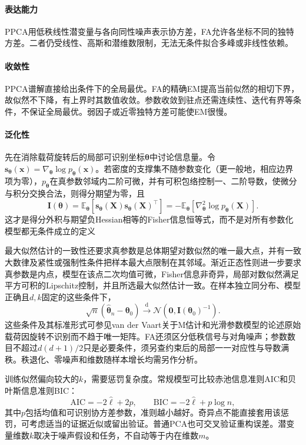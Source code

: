 \paragraph{表达能力}
PPCA用低秩线性潜变量与各向同性噪声表示协方差，FA允许各坐标不同的独特方差。二者仍受线性、高斯和潜维数限制，无法无条件拟合多峰或非线性依赖。

\paragraph{收敛性}

PPCA谱解直接给出条件下的全局最优。FA的精确EM提高当前似然的相切下界，故似然不下降，有上界时其数值收敛。参数收敛到驻点还需连续性、迭代有界等条件，不保证全局最优。弱因子或近零独特方差可能使EM很慢。

\paragraph{泛化性}

先在消除载荷旋转后的局部可识别坐标$\bm{\theta}$中讨论信息量。令$\bm{s}_{\bm{\theta}}(\bm{x})=\nabla_{\bm{\theta}}\log p_{\bm{\theta}}(\bm{x})$。若密度的支撑集不随参数变化（更一般地，相应边界项为零），$p_{\bm{\theta}}$在真参数邻域内二阶可微，并有可积包络控制一、二阶导数，使微分与积分交换合法，则得分期望为零，且
\[
  \bm{I}(\bm{\theta})
  =\mathbb{E}_{\bm{\theta}}\!\left[
      \bm{s}_{\bm{\theta}}(\bm{X})
      \bm{s}_{\bm{\theta}}(\bm{X})^{\top}
    \right]
  =-\mathbb{E}_{\bm{\theta}}\!\left[
      \nabla_{\bm{\theta}}^2\log p_{\bm{\theta}}(\bm{X})
    \right].
\]
这才是得分外积与期望负Hessian相等的Fisher信息恒等式，而不是对所有参数化模型都无条件成立的定义

最大似然估计的一致性还要求真参数是总体期望对数似然的唯一最大点，并有一致大数律及紧性或强制性条件把样本最大点限制在其邻域。渐近正态性则进一步要求真参数是内点，模型在该点二次均值可微，Fisher信息非奇异，局部对数似然满足平方可积的Lipschitz控制，并且所选最大似然估计一致。在样本独立同分布、模型正确且$d,k$固定的这些条件下，
\[
  \sqrt{n}(\widehat{\bm{\theta}}_n-\bm{\theta}_0)
  \xrightarrow{\mathrm d}
  \mathcal{N}\!\left(
    \bm{0},\bm{I}(\bm{\theta}_0)^{-1}
  \right).
\]
这些条件及其标准形式可参见van der Vaart关于M估计和光滑参数模型的论述原始载荷因旋转不识别而不趋于唯一矩阵。FA还须区分低秩信号与对角噪声；参数数目不超过$d(d+1)/2$只是必要条件，须另查约束后的局部一一对应性与导数满秩。秩退化、零噪声和维数随样本增长均需另作分析。

训练似然偏向较大的$k$，需要惩罚复杂度。常规模型可比较赤池信息准则AIC和贝叶斯信息准则BIC：
\[
\mathrm{AIC}=-2\hat{\ell}+2p,\qquad
\mathrm{BIC}=-2\hat{\ell}+p\log n,
\]
其中$p$包括均值和可识别协方差参数，准则越小越好。奇异点不能直接套用该惩罚，可考虑适当的证据近似或留出验证。普通PCA也可交叉验证重构误差。潜变量维数$k$取决于噪声假设和任务，不自动等于内在维数$m$。

